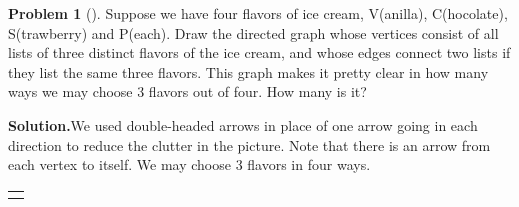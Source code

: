 \documentclass[10pt,]{book}
\theoremstyle{plain}
\theoremstyle{definition}
\newtheorem{activity}[project]{Problem}
\theoremstyle{definition}
\numberwithin{equation}{chapter}
\newlength{\panelmax}
\begin{document}
\begin{activity}[]\label{fourchoosethree}
Suppose we have four flavors of ice cream, V(anilla), C(hocolate), S(trawberry) and P(each). Draw the directed graph whose vertices consist of all lists of three distinct flavors of the ice cream, and whose edges connect two lists if they list the same three flavors. This graph makes it pretty clear in how many ways we may choose 3 flavors out of four. How many is it?%
\par\medskip\noindent%
\textbf{Solution.}\quad We used double-headed arrows in place of one arrow going in each direction to reduce the clutter in the picture. Note that there is an arrow from each vertex to itself. We may choose 3 flavors in four ways.%
{%
\setlength{\panelmax}{0pt}
\newsavebox{\panelboxAZimage}
\newlength{\phAZimage}\setlength{\phAZimage}{\ht\panelboxAZimage+\dp\panelboxAZimage}
\settototalheight{\phAZimage}{\usebox{\panelboxAZimage}}
\setlength{\panelmax}{\maxof{\panelmax}{\phAZimage}}
\leavevmode%
\setlength{\tabcolsep}{0\linewidth}
\par\medskip\noindent
\hspace*{0.15\linewidth}%
\begin{tabular}{@{}*{1}{c}@{}}
\begin{minipage}[c][\panelmax][t]{0.7\linewidth}\usebox{\panelboxAZimage}\end{minipage}\end{tabular}\\
}%
\end{activity}
\end{document}
